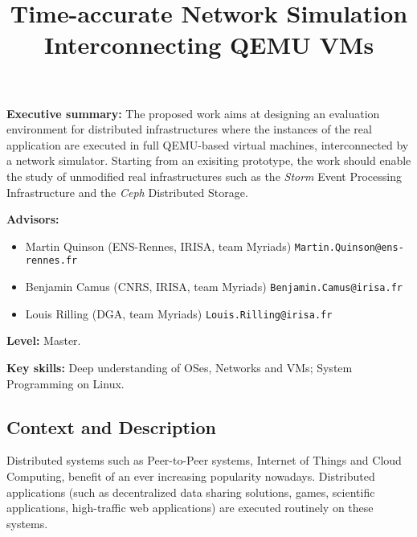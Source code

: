 \documentclass[a4paper,11pt]{article}
\begin{document}
\title{Time-accurate Network Simulation\\ Interconnecting QEMU VMs}

\author{}

\date{}
\maketitle

\vspace{-1.2cm}

\pagestyle{empty}
\thispagestyle{empty}

\noindent \textbf{Executive summary:} The proposed work aims at
designing an evaluation environment for distributed infrastructures
where the instances of the real application are executed in full
QEMU-based virtual machines, interconnected by a network simulator.
Starting from an exisiting prototype, the work should enable the study
of unmodified real infrastructures such as the \textit{Storm} Event
Processing Infrastructure and the \textit{Ceph} Distributed
Storage.

\noindent\textbf{Advisors:}\vspace{-.6\baselineskip}
\begin{itemize}
\item Martin Quinson (ENS-Rennes, IRISA, team Myriads)
  \texttt{Martin.Quinson@ens-rennes.fr}\vspace{-.5\baselineskip} 
\item Benjamin Camus (CNRS, IRISA, team Myriads)
  \texttt{Benjamin.Camus@irisa.fr}\vspace{-.5\baselineskip} 
\item Louis Rilling (DGA, team Myriads) \texttt{Louis.Rilling@irisa.fr} 
\end{itemize}\vspace{-.5\baselineskip}

\noindent \textbf{Level:} Master.

\noindent \textbf{Key skills:} Deep understanding of OSes, Networks
and VMs; System Programming on Linux.


\medskip
\subsection*{Context and Description}

Distributed systems such as Peer-to-Peer systems, Internet of Things
and Cloud Computing, benefit of an ever increasing popularity
nowadays.  Distributed applications (such as decentralized data
sharing solutions, games, scientific applications, high-traffic web
applications) are executed routinely on these systems.
\end{document}
